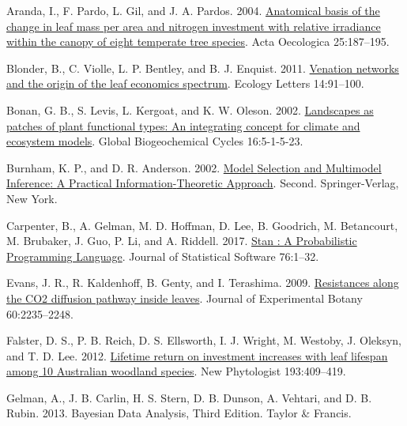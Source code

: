 \documentclass[
  12pt,
]{article}
\begin{document}
\hypertarget{refs}{}
\begin{CSLReferences}{1}{0}
\leavevmode{}%
Aranda, I., F. Pardo, L. Gil, and J. A. Pardos. 2004. \href{https://doi.org/10.1016/j.actao.2004.01.003}{Anatomical basis of the change in leaf mass per area and nitrogen investment with relative irradiance within the canopy of eight temperate tree species}. Acta Oecologica 25:187--195.

\leavevmode{}%
Blonder, B., C. Violle, L. P. Bentley, and B. J. Enquist. 2011. \href{https://doi.org/10.1111/j.1461-0248.2010.01554.x}{Venation networks and the origin of the leaf economics spectrum}. Ecology Letters 14:91--100.

\leavevmode{}%
Bonan, G. B., S. Levis, L. Kergoat, and K. W. Oleson. 2002. \href{https://doi.org/10.1029/2000GB001360}{Landscapes as patches of plant functional types: {An} integrating concept for climate and ecosystem models}. Global Biogeochemical Cycles 16:5-1-5-23.

\leavevmode{}%
Burnham, K. P., and D. R. Anderson. 2002. \href{https://doi.org/10.1007/b97636}{Model {Selection} and {Multimodel Inference}: {A Practical Information}-{Theoretic Approach}}. Second. {Springer-Verlag}, {New York}.

\leavevmode{}%
Carpenter, B., A. Gelman, M. D. Hoffman, D. Lee, B. Goodrich, M. Betancourt, M. Brubaker, J. Guo, P. Li, and A. Riddell. 2017. \href{https://doi.org/10.18637/jss.v076.i01}{Stan : {A Probabilistic Programming Language}}. Journal of Statistical Software 76:1--32.

\leavevmode{}%
Evans, J. R., R. Kaldenhoff, B. Genty, and I. Terashima. 2009. \href{https://doi.org/10.1093/jxb/erp117}{Resistances along the {CO2} diffusion pathway inside leaves}. Journal of Experimental Botany 60:2235--2248.

\leavevmode{}%
Falster, D. S., P. B. Reich, D. S. Ellsworth, I. J. Wright, M. Westoby, J. Oleksyn, and T. D. Lee. 2012. \href{https://doi.org/10.1111/j.1469-8137.2011.03940.x}{Lifetime return on investment increases with leaf lifespan among 10 {Australian} woodland species}. New Phytologist 193:409--419.

\leavevmode{}%
Gelman, A., J. B. Carlin, H. S. Stern, D. B. Dunson, A. Vehtari, and D. B. Rubin. 2013. Bayesian {Data Analysis}, {Third Edition}. {Taylor \& Francis}.


\end{CSLReferences}
\end{document}
